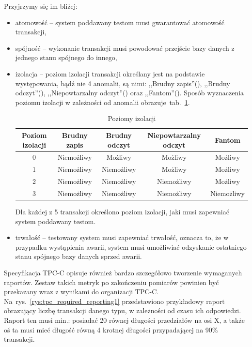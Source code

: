 Przyjrzymy się im bliżej:
\begin{itemize}
\item atomowość -- system poddawany testom musi gwarantować atomowość transakcji,
\item spójność -- wykonanie transakcji musi powodować przejście bazy danych z jednego stanu spójnego do innego,
\item izolacja -- poziom izolacji transakcji określany jest na podstawie występowania, bądź nie 4 anomalii,
są nimi: ,,Brudny zapis''(), ,,Brudny odczyt''(), 
,,Niepowtarzalny odczyt''() oraz ,,Fantom''(). 
Sposób wyznaczenia poziomu izolacji w zależności od anomalii obrazuje~tab.~\ref{tab:isol_tab}.
\begin{table}[h]
\caption{Poziomy izolacji}\label{tab:isol_tab}
\begin{center}
\begin{tabular}{|c|c|c|c|c|}
\hline
Poziom izolacji&Brudny zapis&Brudny odczyt&Niepowtarzalny odczyt&Fantom\\
\hline
0&Niemożliwy&Możliwy&Możliwy&Możliwy\\
\hline
1&Niemożliwy&Niemożliwy&Możliwy&Możliwy\\
\hline
2&Niemożliwy&Niemożliwy&Niemożliwy&Możliwy\\
\hline
3&Niemożliwy&Niemożliwy&Niemożliwy&Niemożliwy\\
\hline
\end{tabular}
\end{center}
\end{table}
Dla każdej z 5 transakcji określono poziom izolacji, jaki musi zapewniać system poddawany testom.
\item trwałość -- testowany system musi zapewniać trwałość, oznacza to, że w przypadku wystąpienia
awarii, system musi umożliwiać odzyskanie ostatniego stanu spójnego bazy danych sprzed awarii.
\end{itemize}

Specyfikacja TPC-C opisuje również bardzo szczegółowo tworzenie wymaganych raportów.
Zestaw takich metryk po zakończeniu pomiarów powinien być przekazany wraz z wynikami do organizacji TPC-C.
Na~rys.~\ref{rys:tpc_required_reporting1} przedstawiono przykładowy raport obrazujący
liczbę transakcji danego typu, w zależności od czasu ich odpowiedzi. Raport ten musi min.: posiadać 
20 równej długości przedziałów na osi X, a także oś ta musi mieć długość równą 
4 krotnej długości przypadającej na 90\% transakcji. 

